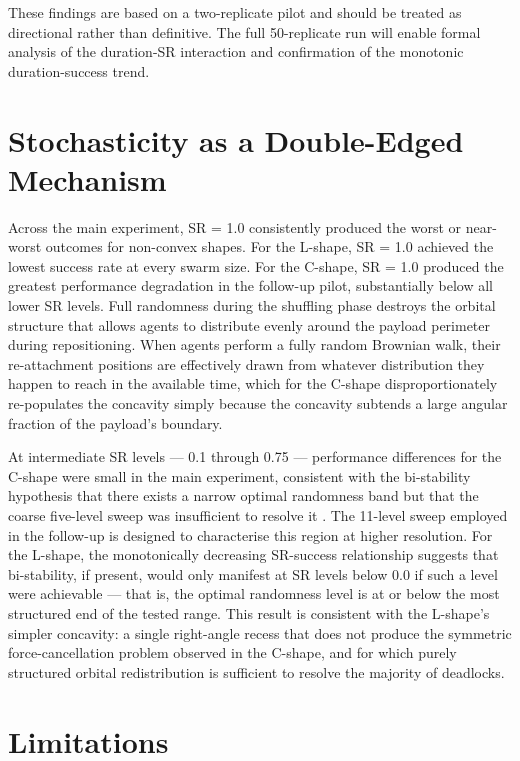 These findings are based on a two-replicate pilot and should be treated as directional rather than definitive. The full 50-replicate run will enable formal analysis of the duration-SR interaction and confirmation of the monotonic duration-success trend.

\section{Stochasticity as a Double-Edged Mechanism}
\label{sec:disc_stochasticity}

Across the main experiment, SR = 1.0 consistently produced the worst or near-worst outcomes for non-convex shapes. For the L-shape, SR = 1.0 achieved the lowest success rate at every swarm size. For the C-shape, SR = 1.0 produced the greatest performance degradation in the follow-up pilot, substantially below all lower SR levels. Full randomness during the shuffling phase destroys the orbital structure that allows agents to distribute evenly around the payload perimeter during repositioning. When agents perform a fully random Brownian walk, their re-attachment positions are effectively drawn from whatever distribution they happen to reach in the available time, which for the C-shape disproportionately re-populates the concavity simply because the concavity subtends a large angular fraction of the payload's boundary.

At intermediate SR levels — 0.1 through 0.75 — performance differences for the C-shape were small in the main experiment, consistent with the bi-stability hypothesis that there exists a narrow optimal randomness band but that the coarse five-level sweep was insufficient to resolve it \citep{springer2022}. The 11-level sweep employed in the follow-up is designed to characterise this region at higher resolution. For the L-shape, the monotonically decreasing SR-success relationship suggests that bi-stability, if present, would only manifest at SR levels below 0.0 if such a level were achievable — that is, the optimal randomness level is at or below the most structured end of the tested range. This result is consistent with the L-shape's simpler concavity: a single right-angle recess that does not produce the symmetric force-cancellation problem observed in the C-shape, and for which purely structured orbital redistribution is sufficient to resolve the majority of deadlocks.

\section{Limitations}
\label{sec:disc_limitations}

